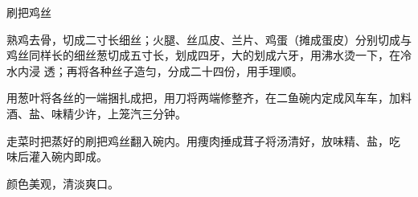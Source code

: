 \begin{recipe}{刷把鸡丝}

\ingredients


\preparation

\step 熟鸡去骨，切成二寸长细丝；火腿、丝瓜皮、兰片、鸡蛋（摊成蛋皮）分别切成与
鸡丝同样长的细丝葱切成五寸长，划成四牙，大的划成六牙，用沸水烫一下，在冷水内浸
透；再将各种丝子造匀，分成二十四份，用手理顺。

\step 用葱叶将各丝的一端捆扎成把，用刀将两端修整齐，在二鱼碗内定成风车车，加料
酒、盐、味精少许，上笼汽三分钟。

\step 走菜时把蒸好的刷把鸡丝翻入碗内。用痩肉捶成茸子将汤清好，放味精、盐，吃
味后灌入碗内即成。

\features

颜色美观，清淡爽口。

\end{recipe}

